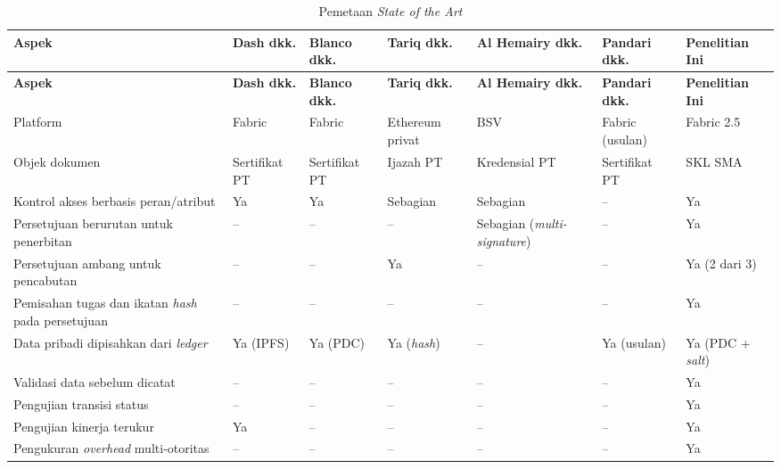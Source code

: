 \begin{longtable}{|>{\raggedright\arraybackslash}p{}|>{\raggedright\arraybackslash}p{}|>{\raggedright\arraybackslash}p{}|>{\raggedright\arraybackslash}p{}|>{\raggedright\arraybackslash}p{}|>{\raggedright\arraybackslash}p{}|>{\raggedright\arraybackslash}p{}|}
	\caption{Pemetaan \textit{State of the Art}}
	\label{table:2.sota}\\
	\hline
	\textbf{Aspek} & \textbf{Dash dkk.} & \textbf{Blanco dkk.} & \textbf{Tariq dkk.} & \textbf{Al Hemairy dkk.} & \textbf{Pandari dkk.} & \textbf{Penelitian Ini} \\
	\hline
	\endfirsthead

	\hline
	\textbf{Aspek} & \textbf{Dash dkk.} & \textbf{Blanco dkk.} & \textbf{Tariq dkk.} & \textbf{Al Hemairy dkk.} & \textbf{Pandari dkk.} & \textbf{Penelitian Ini} \\
	\hline
	\endhead

	Platform & Fabric & Fabric & Ethereum privat & BSV & Fabric (usulan) & Fabric 2.5 \\
	\hline
	Objek dokumen & Sertifikat PT & Sertifikat PT & Ijazah PT & Kreden\-sial PT & Sertifikat PT & SKL SMA \\
	\hline
	Kontrol akses berbasis peran/atribut & Ya & Ya & Sebagian & Sebagian & -- & Ya \\
	\hline
	Persetujuan berurutan untuk penerbitan & -- & -- & -- & Sebagian (\textit{multi-signature}) & -- & Ya \\
	\hline
	Persetujuan ambang untuk pencabutan & -- & -- & Ya & -- & -- & Ya (2 dari 3) \\
	\hline
	Pemisahan tugas dan ikatan \textit{hash} pada persetujuan & -- & -- & -- & -- & -- & Ya \\
	\hline
	Data pribadi dipisahkan dari \textit{ledger} & Ya (IPFS) & Ya (PDC) & Ya (\textit{hash}) & -- & Ya (usulan) & Ya (PDC + \textit{salt}) \\
	\hline
	Validasi data sebelum dicatat & -- & -- & -- & -- & -- & Ya \\
	\hline
	Pengujian transisi status & -- & -- & -- & -- & -- & Ya \\
	\hline
	Pengujian kinerja terukur & Ya & -- & -- & -- & -- & Ya \\
	\hline
	Pengukuran \textit{overhead} multi-otoritas & -- & -- & -- & -- & -- & Ya \\
	\hline
\end{longtable}
\endgroup
{}


